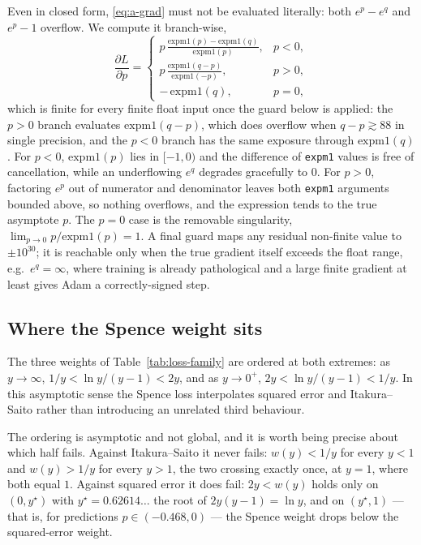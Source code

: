 Even in closed form, \eqref{eq:a-grad} must not be evaluated literally: both
$e^{p}-e^{q}$ and $e^{p}-1$ overflow. We compute it branch-wise,
\begin{equation}
  \frac{\partial L}{\partial p} =
  \begin{cases}
    \displaystyle p\,\frac{\mathrm{expm1}(p)-\mathrm{expm1}(q)}{\mathrm{expm1}(p)},
      & p<0,\\[2.2ex]
    \displaystyle p\,\frac{\mathrm{expm1}(q-p)}{\mathrm{expm1}(-p)}, & p>0,\\[2.2ex]
    -\,\mathrm{expm1}(q), & p=0,
  \end{cases}
  \label{eq:a-branches}
\end{equation}
which is finite for every finite float input once the guard below is
applied: the $p>0$ branch evaluates $\mathrm{expm1}(q-p)$, which does overflow
when $q-p\gtrsim88$ in single precision, and the $p<0$ branch has the same
exposure through $\mathrm{expm1}(q)$. For $p<0$, $\mathrm{expm1}(p)$
lies in $[-1,0)$ and the difference of \texttt{expm1} values is free of
cancellation, while an underflowing $e^{q}$ degrades gracefully to $0$. For
$p>0$, factoring $e^{p}$ out of numerator and denominator leaves both
\texttt{expm1} arguments bounded above, so nothing overflows, and the
expression tends to the true asymptote $p$. The $p=0$ case is the removable
singularity, $\lim_{p\to0}p/\mathrm{expm1}(p)=1$. A final guard maps any
residual non-finite value to $\pm10^{30}$; it is reachable only when the true
gradient itself exceeds the float range, e.g.\ $e^{q}=\infty$, where training
is already pathological and a large finite gradient at least gives Adam a
correctly-signed step.

\subsection{Where the Spence weight sits}

The three weights of Table~\ref{tab:loss-family} are ordered at both extremes:
as $y\to\infty$, $1/y < \ln y/(y-1) < 2y$, and as $y\to0^{+}$,
$2y < \ln y/(y-1) < 1/y$. In this asymptotic sense the Spence loss
interpolates squared error and Itakura--Saito rather than introducing an
unrelated third behaviour.

The ordering is asymptotic and not global, and it is worth being precise about
which half fails. Against Itakura--Saito it never fails: $w(y)<1/y$ for every
$y<1$ and $w(y)>1/y$ for every $y>1$, the two crossing exactly once, at $y=1$,
where both equal $1$. Against squared error it does fail: $2y<w(y)$ holds only
on $(0,y^{\star})$ with $y^{\star}=0.62614\ldots$ the root of
$2y(y-1)=\ln y$, and on $(y^{\star},1)$ --- that is, for predictions
$p\in(-0.468,0)$ --- the Spence weight drops below the squared-error weight.

